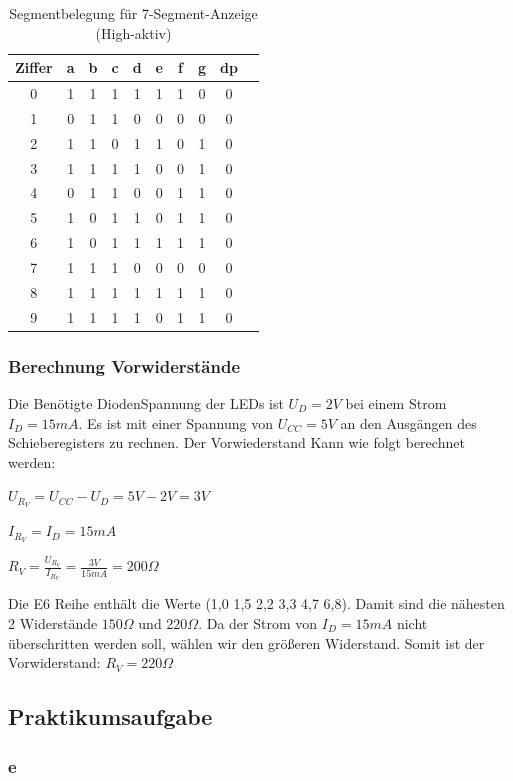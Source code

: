 \begin{table}[h]
\centering

\begin{tabular}{|c|c|c|c|c|c|c|c|c|c|}
\hline
\textbf{Ziffer} & \textbf{a} & \textbf{b} & \textbf{c} & \textbf{d} & \textbf{e} & \textbf{f} & \textbf{g} & \textbf{dp} \\ \hline
0 & 1 & 1 & 1 & 1 & 1 & 1 & 0 & 0 \\ \hline
1 & 0 & 1 & 1 & 0 & 0 & 0 & 0 & 0 \\ \hline
2 & 1 & 1 & 0 & 1 & 1 & 0 & 1 & 0 \\ \hline
3 & 1 & 1 & 1 & 1 & 0 & 0 & 1 & 0 \\ \hline
4 & 0 & 1 & 1 & 0 & 0 & 1 & 1 & 0 \\ \hline
5 & 1 & 0 & 1 & 1 & 0 & 1 & 1 & 0 \\ \hline
6 & 1 & 0 & 1 & 1 & 1 & 1 & 1 & 0 \\ \hline
7 & 1 & 1 & 1 & 0 & 0 & 0 & 0 & 0 \\ \hline
8 & 1 & 1 & 1 & 1 & 1 & 1 & 1 & 0 \\ \hline
9 & 1 & 1 & 1 & 1 & 0 & 1 & 1 & 0 \\ \hline
\end{tabular}
\caption{Segmentbelegung für 7-Segment-Anzeige (High-aktiv)}
\end{table}

\subsubsection{Berechnung Vorwiderstände}
Die Benötigte DiodenSpannung der LEDs ist $U_D=2V$ bei einem Strom $I_D=15mA$. Es ist mit einer Spannung von $U_{CC}=5V$ an den Ausgängen des Schieberegisters zu rechnen. Der Vorwiederstand Kann wie folgt berechnet werden:

$
U_{R_V} = U_{CC} - U_D = 5V - 2V = 3V
$

$
I_{R_V} = I_D = 15mA
$

$
R_V=\frac{U_{R_V}}{I_{R_V}} = \frac{3V}{15mA} = 200 \Omega
$

Die E6 Reihe enthält die Werte (1,0 1,5 2,2 3,3 4,7 6,8). Damit sind die nähesten 2 Widerstände $150\Omega$ und $220\Omega$. Da der Strom von $I_D=15mA$ nicht überschritten werden soll, wählen wir den größeren Widerstand. Somit ist der Vorwiderstand: $R_V=220\Omega$

\subsection{Praktikumsaufgabe}

\subsubsection{e}

\begin{verbatim}
\end{verbatim}


